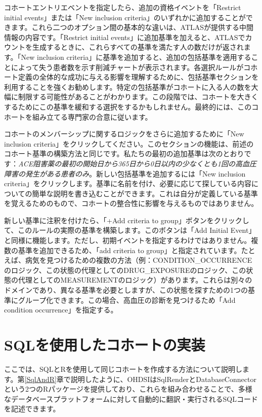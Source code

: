 \documentclass[
  11pt]{book}
\theoremstyle{definition}
\theoremstyle{definition}
\theoremstyle{definition}
\theoremstyle{definition}
\theoremstyle{remark}
\begin{document}
コホートエントリエベントを指定したら、追加の資格イベントを「Restrict initial events」または「New inclusion criteria」のいずれかに追加することができます。これら二つのオプション間の基本的な違いは、ATLASが提供する中間情報の内容です。「Restrict initial events」に追加基準を加えると、ATLASでカウントを生成するときに、これらすべての基準を満たす人の数だけが返されます。「New inclusion criteria」に基準を追加すると、追加の包括基準を適用することによって失う患者数を示す削減チャートが表示されます。各選択ルールがコホート定義の全体的な成功に与える影響を理解するために、包括基準セクションを利用することを強くお勧めします。特定の包括基準がコホートに入る人の数を大幅に制限する可能性があることがわかります。この段階では、コホートを大きくするためにこの基準を緩和する選択をするかもしれません。最終的には、このコホートを組み立てる専門家の合意に従います。

コホートのメンバーシップに関するロジックをさらに追加するために「New inclusion criteria」をクリックしてください。このセクションの機能は、前述のコホート基準の構築方法と同じです。私たちの最初の追加基準は次のとおりです：\emph{ACE阻害薬の最初の開始日から365日から0日以内の少なくとも1回の高血圧障害の発生がある患者のみ}。新しい包括基準を追加するには「New inclusion criteria」をクリックします。基準に名前を付け、必要に応じて探している内容についての簡単な説明を書き込むことができます。これは自分が定義している基準を覚えるためのもので、コホートの整合性に影響を与えるものではありません。

新しい基準に注釈を付けたら、「+Add criteria to group」ボタンをクリックして、このルールの実際の基準を構築します。このボタンは「Add Initial Event」と同様に機能します。ただし、初期イベントを指定するわけではありません。複数の基準を追加できるため、「add criteria to group」と指定されています。たとえば、病気を見つけるための複数の方法（例：CONDITION\_OCCURRENCEのロジック、この状態の代理としてのDRUG\_EXPOSUREのロジック、この状態の代理としてのMEASUREMENTのロジック）があります。これらは別々のドメインであり、異なる基準を必要としますが、この状態を探すための1つの基準にグループ化できます。この場合、高血圧の診断を見つけるため「Add condition occurrence」を指定する。

\section{SQLを使用したコホートの実装}\label{sqlux3092ux4f7fux7528ux3057ux305fux30b3ux30dbux30fcux30c8ux306eux5b9fux88c5}

ここでは、SQLとRを使用して同じコホートを作成する方法について説明します。第\ref{SqlAndR}章で説明したように、OHDSIはSqlRenderとDatabaseConnectorという2つのRパッケージを提供しており、これらを組み合わせることで、多様なデータベースプラットフォームに対して自動的に翻訳・実行されるSQLコードを記述できます。
\end{document}
